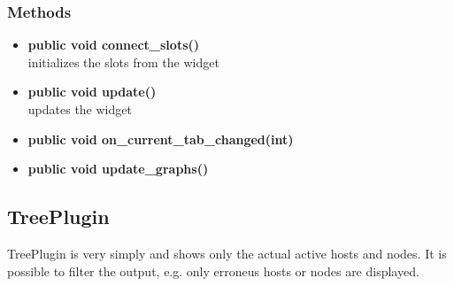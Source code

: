 \subsubsection{Methods}
\begin{itemize}
  \item \textbf{public void connect\_slots()}\\
  initializes the slots from the widget
  \item \textbf{public void update()}\\
  updates the widget
  \item \textbf{public void on\_current\_tab\_changed(int)}\\
  
  \item \textbf{public void update\_graphs()}\\
  
\end{itemize}

\subsection{TreePlugin}
TreePlugin is very simply and shows only the actual active hosts
and nodes. It is possible to filter the output, e.g. only erroneus hosts or
nodes are displayed.
